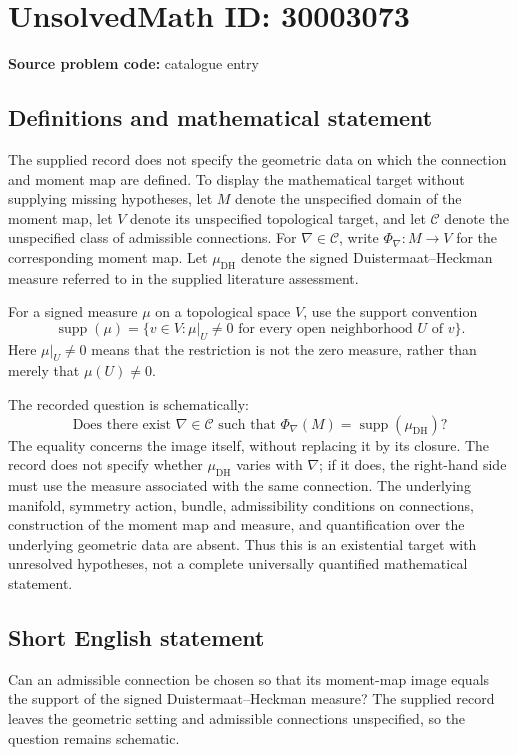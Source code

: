 \documentclass[11pt]{article}
\begin{document}
\section*{UnsolvedMath ID: 30003073}
\textbf{Source problem code:} catalogue entry
\subsection{Definitions and mathematical statement}
The supplied record does not specify the geometric data on which the connection and moment map are defined. To display the mathematical target without supplying missing hypotheses, let \(M\) denote the unspecified domain of the moment map, let \(V\) denote its unspecified topological target, and let \(\mathcal C\) denote the unspecified class of admissible connections. For \(\nabla\in\mathcal C\), write \(\Phi_\nabla\colon M\to V\) for the corresponding moment map. Let \(\mu_{\mathrm{DH}}\) denote the signed Duistermaat--Heckman measure referred to in the supplied literature assessment.

For a signed measure \(\mu\) on a topological space \(V\), use the support convention
\[
\operatorname{supp}(\mu)=\bigl\{v\in V: \mu|_U\ne 0\text{ for every open neighborhood }U\text{ of }v\bigr\}.
\]
Here \(\mu|_U\ne0\) means that the restriction is not the zero measure, rather than merely that \(\mu(U)\ne0\).

The recorded question is schematically:
\[
\text{Does there exist }\nabla\in\mathcal C\text{ such that }
\Phi_\nabla(M)=\operatorname{supp}(\mu_{\mathrm{DH}})?
\]
The equality concerns the image itself, without replacing it by its closure. The record does not specify whether \(\mu_{\mathrm{DH}}\) varies with \(\nabla\); if it does, the right-hand side must use the measure associated with the same connection. The underlying manifold, symmetry action, bundle, admissibility conditions on connections, construction of the moment map and measure, and quantification over the underlying geometric data are absent. Thus this is an existential target with unresolved hypotheses, not a complete universally quantified mathematical statement.
\subsection{Short English statement}
Can an admissible connection be chosen so that its moment-map image equals the support of the signed Duistermaat--Heckman measure? The supplied record leaves the geometric setting and admissible connections unspecified, so the question remains schematic.
\end{document}
